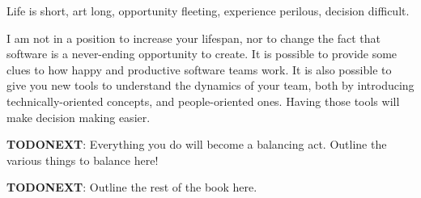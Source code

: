 \begin{verso}
Life is short,
art long,
opportunity fleeting,
experience perilous,
decision difficult.
\end{verso}

I am not in a position to increase your lifespan, nor to change the fact that software is a never-ending opportunity to create. It is possible to provide some clues to how happy and productive software teams work. It is also possible to give you new tools to understand the dynamics of your team, both by introducing technically-oriented concepts, and people-oriented ones. Having those tools will make decision making easier.

\textbf{TODONEXT}: Everything you do will become a balancing act. Outline the various things to balance here!

\textbf{TODONEXT}: Outline the rest of the book here.


\newpage
\thispagestyle{empty}
